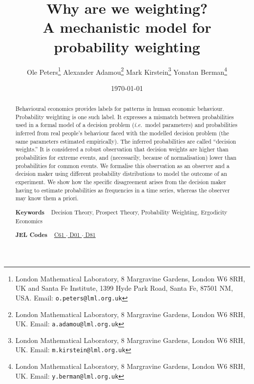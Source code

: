 \documentclass[a4paper, 12pt]{article}
\title{Why are we weighting? \\
{\small A mechanistic model for probability weighting}}
\author{
Ole Peters\footnote{London Mathematical Laboratory, 8 Margravine Gardens, London W6 8RH, UK and Santa Fe Institute, 1399 Hyde Park Road, Santa Fe, 87501 NM, USA. Email: \texttt{o.peters@lml.org.uk}} \;
Alexander Adamou\footnote{London Mathematical Laboratory, 8 Margravine Gardens, London W6 8RH, UK. Email: \texttt{a.adamou@lml.org.uk}} \;
Mark Kirstein\footnote{London Mathematical Laboratory, 8 Margravine Gardens, London W6 8RH, UK. Email: \texttt{m.kirstein@lml.org.uk}} \;
Yonatan Berman\footnote{London Mathematical Laboratory, 8 Margravine Gardens, London W6 8RH, UK. Email: \texttt{y.berman@lml.org.uk}} 
}
\date{\today}
\newcommand{\ie}{{\it i.e.}\ }
\begin{document}
\begin{titlepage}
	\maketitle
\thispagestyle{fancy}

\begin{abstract}
\noindent 
Behavioural economics provides labels for patterns in human economic behaviour. 
Probability weighting is one such label. It expresses a mismatch between probabilities used in a formal model of a decision problem (\ie model parameters) and probabilities inferred from real people's behaviour faced with the modelled decision problem (the same parameters estimated empirically). The inferred probabilities are called ``decision weights.'' 
It is considered a robust observation that decision weights are higher than probabilities for extreme events, and (necessarily, because of normalisation) lower than probabilities for common events. 
We formalise this observation as an observer and a decision maker using different probability distributions to model the outcome of an experiment.
We show how the specific disagreement arises from the decision maker having to estimate probabilities as frequencies in a time series, whereas the observer may know them a priori. 
\vspace{1em}

\noindent\textsf{\textbf{Keywords}} ~ Decision Theory, Prospect Theory, Probability Weighting, Ergodicity Economics
\vspace{.5em}

\noindent\textsf{\textbf{JEL Codes}} ~
\href{https://www.aeaweb.org/econlit/jelCodes.php?view=jel#C}{%
C61		%
$\cdot$
}%
\href{https://www.aeaweb.org/econlit/jelCodes.php?view=jel#D}{%
D01 	%
$\cdot$
D81 	%
}
\end{abstract}
\end{titlepage}
 
\setcounter{page}{2}		%

 
\end{document}
